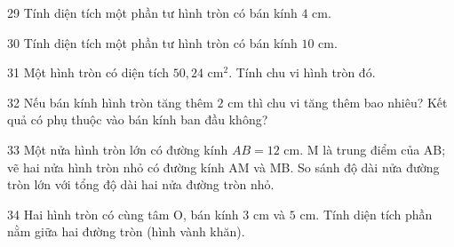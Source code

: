 \gap
\begin{probbox}{29}{\relax}
Tính diện tích một phần tư hình tròn có bán kính $4$ cm.
\end{probbox}
\gap
\begin{probbox}{30}{\relax}
Tính diện tích một phần tư hình tròn có bán kính $10$ cm.
\end{probbox}
\begin{probbox}{31}{}
Một hình tròn có diện tích $50{,}24$ cm$^2$. Tính chu vi hình tròn đó.
\end{probbox}
\gap
\begin{probbox}{32}{}
Nếu bán kính hình tròn tăng thêm $2$ cm thì chu vi tăng thêm bao nhiêu? Kết quả có phụ thuộc vào bán kính ban đầu không?
\end{probbox}
\gap
\begin{probbox}{33}{}
Một nửa hình tròn lớn có đường kính $AB=12$ cm. M là trung điểm của AB; vẽ hai nửa hình tròn nhỏ có đường kính AM và MB. So sánh độ dài nửa đường tròn lớn với tổng độ dài hai nửa đường tròn nhỏ.
\end{probbox}
\gap
\begin{probbox}{34}{}
Hai hình tròn có cùng tâm O, bán kính $3$ cm và $5$ cm. Tính diện tích phần nằm giữa hai đường tròn (hình vành khăn).
\end{probbox}
